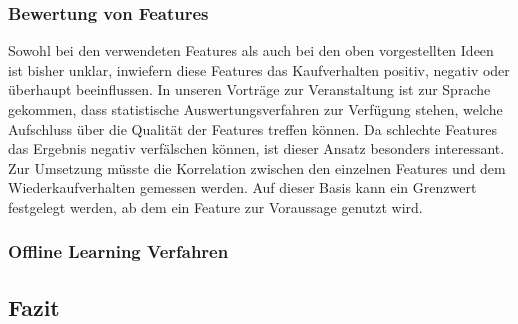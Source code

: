 \subsubsection{Bewertung von Features}	
Sowohl bei den verwendeten Features als auch bei den oben vorgestellten Ideen ist bisher unklar, inwiefern diese Features das Kaufverhalten positiv, negativ oder überhaupt beeinflussen.
In unseren Vorträge zur Veranstaltung ist zur Sprache gekommen, dass statistische Auswertungsverfahren zur Verfügung stehen, welche Aufschluss über die Qualität der Features treffen können. Da schlechte Features das Ergebnis negativ verfälschen können, ist dieser Ansatz besonders interessant.
Zur Umsetzung müsste die Korrelation zwischen den einzelnen Features und dem Wiederkaufverhalten gemessen werden. Auf dieser Basis kann ein Grenzwert festgelegt werden, ab dem ein Feature
zur Voraussage genutzt wird.

\subsubsection{Offline Learning Verfahren}	
	

\subsection{Fazit}
